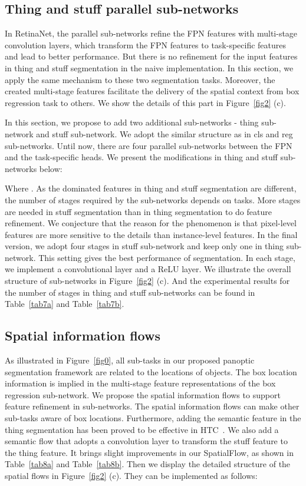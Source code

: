 \documentclass[journal,final]{IEEEtran}
\begin{document}
\subsection{Thing and stuff parallel sub-networks}
In RetinaNet, the parallel sub-networks refine the FPN features with multi-stage convolution layers, which transform the FPN features to task-specific features and lead to better performance. But there is no refinement for the input features in thing and stuff segmentation in the naive implementation. In this section, we apply the same mechanism to these two segmentation tasks. Moreover, the created multi-stage features facilitate the delivery of the spatial context from box regression task to others. We show the details of this part in Figure~\ref{fig2} (c).

In this section, we propose to add two additional sub-networks - thing sub-network and stuff sub-network. We adopt the similar structure as in cls and reg sub-networks. Until now, there are four parallel sub-networks between the FPN and the task-specific heads. We present the modifications in thing and stuff sub-networks below:

Where . As the dominated features in thing and stuff segmentation are different, the number of stages required by the sub-networks depends on tasks. More stages are needed in stuff segmentation than in thing segmentation to do feature refinement. We conjecture that the reason for the phenomenon is that pixel-level features are more sensitive to the details than instance-level features. In the final version, we adopt four stages in stuff sub-network and keep only one in thing sub-network. This setting gives the best performance of segmentation. In each stage, we implement a  convolutional layer and a ReLU layer. We illustrate the overall structure of sub-networks in Figure~\ref{fig2} (c). And the experimental results for the number of stages in thing and stuff sub-networks can be found in Table~\ref{tab7a} and Table~\ref{tab7b}.

\subsection{Spatial information flows}
As illustrated in Figure~\ref{fig0}, all sub-tasks in our proposed panoptic segmentation framework are related to the locations of objects. The box location information is implied in the multi-stage feature representations of the box regression sub-network. We propose the spatial information flows to support feature refinement in sub-networks. The spatial information flows can make other sub-tasks aware of box locations. Furthermore, adding the semantic feature in the thing segmentation has been proved to be effective in HTC~\cite{htc}. We also add a semantic flow that adopts a  convolution layer to transform the stuff feature to the thing feature. It brings slight improvements in our SpatialFlow, as shown in Table~\ref{tab8a} and Table~\ref{tab8b}. Then we display the detailed structure of the spatial flows in Figure~\ref{fig2} (c). They can be implemented as follows:
\end{document}
